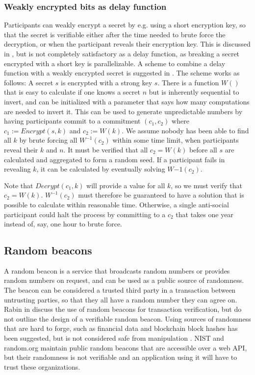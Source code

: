 \subsubsection{Weakly encrypted bits as delay function}
Participants can weakly encrypt a secret by e.g. using a short encryption key, so that the secret is verifiable either after the time needed to brute force the decryption, or when the participant reveals their encryption key.
This is discussed in \cite{syverson_weakly_1998}, but is not completely satisfactory as a delay function, as breaking a secret encrypted with a short key is parallelizable. 
A scheme to combine a delay function with a weakly encrypted secret is suggested in \cite{rivest_time-lock_1996}. The scheme works as follows: A secret $s$ is encrypted with a strong key $s$. There is a function $W()$ that is easy to calculate if one knows a secret $n$ but is inherently sequential to invert, and can be initialized with a parameter that says how many computations are needed to invert it.
This can be used to generate unpredictable numbers by having participants commit to a commitment $(c_1, c_2)$ where $c_1:=Encrypt(s, k)$ and $c_2:=W(k)$. We assume nobody has been able to find all $k$ by brute forcing all $W^{-1}(c_2)$ within some time limit, when participants reveal their $k$ and $n$. It must be verified that all $c_2=W(k)$ before all $s$ are calculated and aggregated to form a random seed. If a participant fails in revealing $k$, it can be calculated by eventually solving $W{-1}(c_2)$.

Note that $Decrypt(c_1, k)$ will provide a value for all $k$, so we must verify that $c_2=W(k)$. $W^{-1}(c_2)$ must therefore be guaranteed to have a solution that is possible to calculate within reasonable time. Otherwise, a single anti-social participant could halt the process by committing to a $c_2$ that takes one year instead of, say, one hour to brute force. 


\subsection{Random beacons}

A random beacon is a service that broadcasts random numbers or provides random numbers on request, and can be used as a public source of randomness. The beacon can be considered a trusted third party in a transaction between untrusting parties, so that they all have a random number they can agree on. Rabin in \cite{rabin_transaction_1983} discuss the use of random beacons for transaction verification, but do not outline the design of a verifiable random beacon. Using sources of randomness that are hard to forge, such as financial data \cite{clark_use_2010} and blockchain block hashes \cite{bentov_bitcoin_2016, yajam_improvement_2019} has been suggested, but is not considered safe from manipulation \cite{bonneau_bitcoin_2015, pierrot_malleability_2018}. NIST \cite{nist_nist_2019} and random.org maintain public random beacons that are accessible over a web API, but their randomness is not verifiable and an application using it will have to trust these organizations. 


